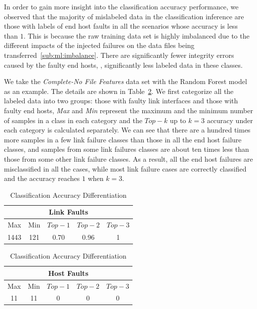 In order to gain more insight into the classification accuracy performance, we observed that the majority of mislabeled data in the classification inference are those with labels of end host faults in all the scenarios whose accuracy is less than $1$.  This is because the raw training data set is highly imbalanced due to the different impacts of the injected failures on the data files being transferred~\ref{sub:ml:imbalance}. There are significantly fewer integrity errors caused by the faulty end hosts, \ie, significantly less labeled data in these classes. 

We take the {\it Complete-No File Features} data set with the Random Forest model as an example. The details are shown in Table~\ref{tab:class}. We first categorize all the labeled data into two groups: those with faulty link interfaces and those with faulty end hosts, {\it Max} and {\it Min} represent the maximum and the minimum number of samples in a class in each category and the $Top-k$ up to $k=3$ accuracy under each category is calculated separately. We can see that there are a hundred times more samples in a few link failure classes than those in all the end host failure classes, and samples from some link failures classes are about ten times less than those from some other link failure classes. As a result, all the end host failures are misclassified in all the cases, while most link failure cases are correctly classified and the accuracy reaches $1$ when $k=3$.

\begin{table}[!ht]
\caption{Classification Accuracy Differentiation}
\label{tab:class}
\begin{center}
\begin{tabular}{ |c|c|c|c|c| } 
 \hline
  \multicolumn{5}{|c|}{Link Faults} \\
 \hline
 Max & Min & $Top-1$ & $Top-2$ & $Top-3$\\ 
 \hline
 1443 & 121  & 0.70 &  0.96 & 1 \\
 \hline
\end{tabular}

\begin{tabular}{ |c|c|c|c|c|} 
 \hline
\multicolumn{5}{|c|}{Host Faults} \\
 \hline
 Max & Min & $Top-1$ & $Top-2$ & $Top-3$ \\ 
 \hline
11 & 11  & 0 &  0 & 0\\
  \hline
\end{tabular}
\end{center}
\end{table}

